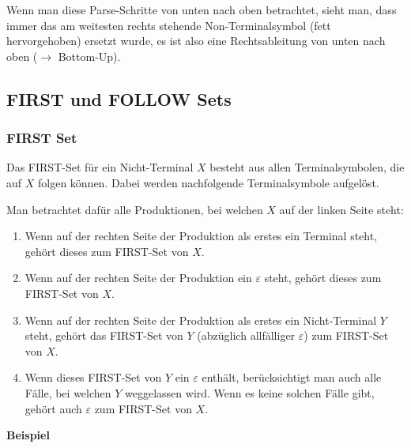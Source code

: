 Wenn man diese Parse-Schritte von unten nach oben betrachtet, sieht man, dass immer das am weitesten
rechts stehende Non-Terminalsymbol (fett hervorgehoben) ersetzt wurde, es ist also eine
Rechtsableitung von unten nach oben ($\rightarrow$ Bottom-Up).


\subsection{FIRST und FOLLOW Sets}

\subsubsection{FIRST Set}

Das FIRST-Set für ein Nicht-Terminal $X$ besteht aus allen Terminalsymbolen, die auf $X$ folgen können.
Dabei werden nachfolgende Terminalsymbole aufgelöst.

Man betrachtet dafür alle Produktionen, bei welchen $X$ auf der linken Seite steht:

\begin{enumerate}
	\item Wenn auf der rechten Seite der Produktion als erstes ein Terminal steht, gehört dieses
		zum FIRST-Set von $X$.
	\item Wenn auf der rechten Seite der Produktion ein $\varepsilon$ steht, gehört dieses zum
		FIRST-Set von $X$.
	\item Wenn auf der rechten Seite der Produktion als erstes ein Nicht-Terminal $Y$ steht, gehört
		das FIRST-Set von $Y$ (abzüglich allfälliger $\varepsilon$) zum FIRST-Set von $X$.
	\item Wenn dieses FIRST-Set von $Y$ ein $\varepsilon$ enthält, berücksichtigt man auch alle Fälle,
		bei welchen $Y$ weggelassen wird. Wenn es keine solchen Fälle gibt, gehört auch
		$\varepsilon$ zum FIRST-Set von $X$.
\end{enumerate}

\textbf{Beispiel}

